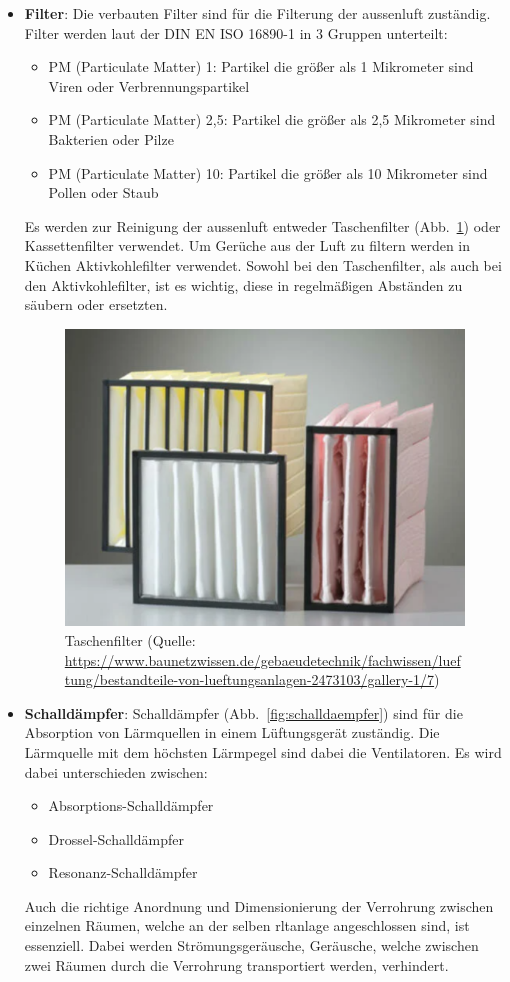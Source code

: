 \begin{itemize}
\item \textbf{Filter}: Die verbauten Filter sind für die Filterung der \gls{aussenluft} zuständig. Filter werden laut der DIN EN ISO 16890-1 in 3 Gruppen unterteilt:
\begin{itemize}
	\item PM (Particulate Matter) 1: Partikel die größer als 1 Mikrometer sind \zB Viren oder Verbrennungspartikel 
	\item PM (Particulate Matter) 2,5: Partikel die größer als 2,5 Mikrometer sind \zB Bakterien oder Pilze
	\item PM (Particulate Matter) 10: Partikel die größer als 10 Mikrometer sind \zB Pollen oder Staub
\end{itemize}
Es werden zur Reinigung der \gls{aussenluft} entweder Taschenfilter (Abb.~\ref{fig:taschenfilter}) oder Kassettenfilter verwendet. Um Gerüche aus der Luft zu filtern \zB werden in Küchen Aktivkohlefilter verwendet. Sowohl bei den Taschenfilter, als auch bei den Aktivkohlefilter, ist es wichtig, diese in regelmäßigen Abständen zu säubern oder ersetzten.  

\begin{figure}[H]
	\centering
	\includegraphics[width=0.4\linewidth]{Bilder/normalefilter}
	\caption[Taschenfilter (Quelle: \url{	https://www.baunetzwissen.de/gebaeudetechnik/fachwissen/lueftung/bestandteile-von-lueftungsanlagen-2473103/gallery-1/7}, Zugriff am 13.02.2024)]{Taschenfilter (Quelle: \url{	https://www.baunetzwissen.de/gebaeudetechnik/fachwissen/lueftung/bestandteile-von-lueftungsanlagen-2473103/gallery-1/7})} 
	
	\label{fig:taschenfilter}
\end{figure}

	\item \textbf{Schalldämpfer}: Schalldämpfer (Abb.~\ref{fig:schalldaempfer}) sind für die Absorption von Lärmquellen in einem Lüftungsgerät zuständig. Die Lärmquelle mit dem höchsten Lärmpegel sind dabei die Ventilatoren. Es wird dabei unterschieden zwischen:
\begin{itemize}
	\item Absorptions-Schalldämpfer 
	\item Drossel-Schalldämpfer
	\item Resonanz-Schalldämpfer
\end{itemize} 
	Auch die richtige Anordnung und Dimensionierung der Verrohrung zwischen einzelnen Räumen, welche an der selben \ac{rltanlage} angeschlossen sind, ist essenziell. Dabei werden Strömungsgeräusche, Geräusche, welche zwischen zwei Räumen durch die Verrohrung transportiert werden, verhindert.


\end{itemize}
